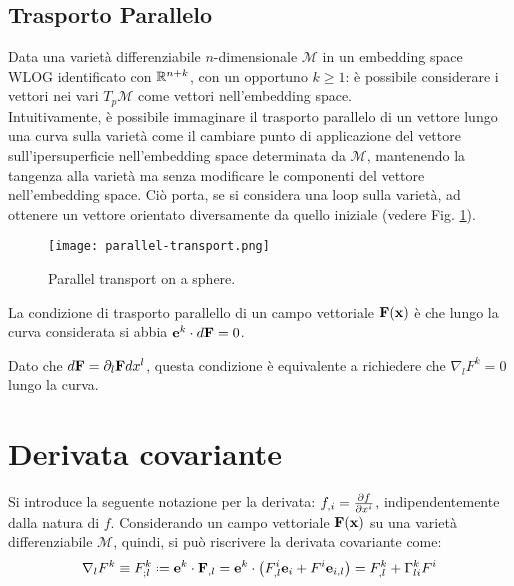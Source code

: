 \subsection{Trasporto Parallelo}

Data una varietà differenziabile $ n $-dimensionale $ \mathcal{M} $ in un embedding space WLOG identificato con $ \mathbb{R}^{n+k} $, con un opportuno $ k \ge 1 $: è possibile considerare i vettori nei vari $ T_p\mathcal{M} $ come vettori nell'embedding space.\\
Intuitivamente, è possibile immaginare il trasporto parallelo di un vettore lungo una curva sulla varietà come il cambiare punto di applicazione del vettore sull'ipersuperficie nell'embedding space determinata da $ \mathcal{M} $, mantenendo la tangenza alla varietà ma senza modificare le componenti del vettore nell'embedding space. Ciò porta, se si considera una loop sulla varietà, ad ottenere un vettore orientato diversamente da quello iniziale (vedere Fig. \ref{par-tr}).
\begin{figure}
	\centering
	\texttt{[image: parallel-transport.png]}
	\caption{Parallel transport on a sphere.}
	\label{par-tr}
\end{figure}

\begin{proposition}
	La condizione di trasporto parallello di un campo vettoriale $ \mathbf{F}(\mathbf{x}) $ è che lungo la curva considerata si abbia $ \mathbf{e}^k \cdot d\mathbf{F} = 0 $.
\end{proposition}
Dato che $ d\mathbf{F} = \partial_l \mathbf{F} dx^l $, questa condizione è equivalente a richiedere che $ \nabla_l F^k = 0 $ lungo la curva.

\section{Derivata covariante}

Si introduce la seguente notazione per la derivata: $ f_{,i} = \frac{\partial f}{\partial x^i} $, indipendentemente dalla natura di $ f $.
Considerando un campo vettoriale $ \mathbf{F}(\mathbf{x}) $ su una varietà differenziabile $ \mathcal{M} $, quindi, si può riscrivere la derivata covariante come:
\begin{equation}
	\nabla_l F^k \equiv F^k_{;l} \defeq \ve{e}^k \cdot \ve{F}_{,l} = \ve{e}^k \cdot \left( F^i_{,l} \ve{e}_i + F^i \ve{e}_{i,l} \right) = F^k_{,l} + \Gamma^k_{li} F^i
	\label{eq:4.7}
\end{equation}


